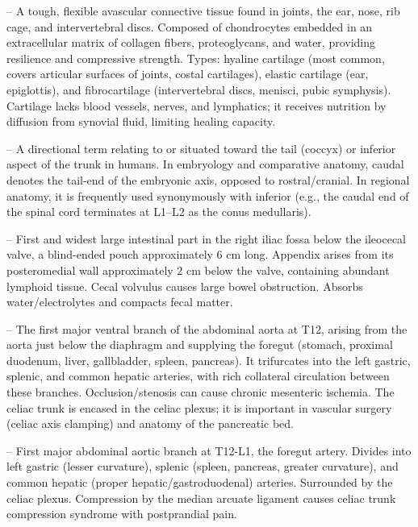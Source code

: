 -- A tough, flexible avascular connective tissue found in joints, the ear, nose, rib cage, and intervertebral discs. Composed of chondrocytes embedded in an extracellular matrix of collagen fibers, proteoglycans, and water, providing resilience and compressive strength. Types: hyaline cartilage (most common, covers articular surfaces of joints, costal cartilages), elastic cartilage (ear, epiglottis), and fibrocartilage (intervertebral discs, menisci, pubic symphysis). Cartilage lacks blood vessels, nerves, and lymphatics; it receives nutrition by diffusion from synovial fluid, limiting healing capacity.

-- A directional term relating to or situated toward the tail (coccyx) or inferior aspect of the trunk in humans. In embryology and comparative anatomy, caudal denotes the tail-end of the embryonic axis, opposed to rostral/cranial. In regional anatomy, it is frequently used synonymously with inferior (e.g., the caudal end of the spinal cord terminates at L1--L2 as the conus medullaris).

-- First and widest large intestinal part in the right iliac fossa below the ileocecal valve, a blind-ended pouch approximately 6 cm long. Appendix arises from its posteromedial wall approximately 2 cm below the valve, containing abundant lymphoid tissue. Cecal volvulus causes large bowel obstruction. Absorbs water/electrolytes and compacts fecal matter.

-- The first major ventral branch of the abdominal aorta at T12, arising from the aorta just below the diaphragm and supplying the foregut (stomach, proximal duodenum, liver, gallbladder, spleen, pancreas). It trifurcates into the left gastric, splenic, and common hepatic arteries, with rich collateral circulation between these branches. Occlusion/stenosis can cause chronic mesenteric ischemia. The celiac trunk is encased in the celiac plexus; it is important in vascular surgery (celiac axis clamping) and anatomy of the pancreatic bed.

-- First major abdominal aortic branch at T12-L1, the foregut artery. Divides into left gastric (lesser curvature), splenic (spleen, pancreas, greater curvature), and common hepatic (proper hepatic/gastroduodenal) arteries. Surrounded by the celiac plexus. Compression by the median arcuate ligament causes celiac trunk compression syndrome with postprandial pain.

